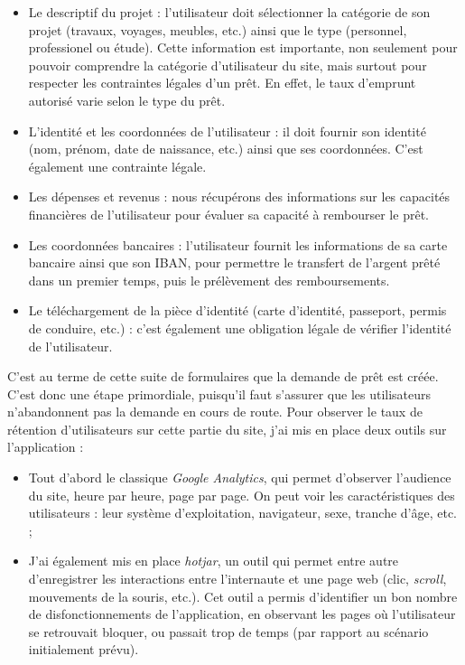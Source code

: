 \documentclass[12pt,a4paper]{article}
\providecommand{\tightlist}{%
  \setlength{\itemsep}{0pt}\setlength{\parskip}{0pt}}
\begin{document}
  \begin{itemize}
  \tightlist
  \item
    Le descriptif du projet : l'utilisateur doit sélectionner la catégorie
    de son projet (travaux, voyages, meubles, etc.) ainsi que le type
    (personnel, professionel ou étude). Cette information est importante,
    non seulement pour pouvoir comprendre la catégorie d'utilisateur du
    site, mais surtout pour respecter les contraintes légales d'un prêt.
    En effet, le taux d'emprunt autorisé varie selon le type du prêt.
  \item
    L'identité et les coordonnées de l'utilisateur : il doit fournir son
    identité (nom, prénom, date de naissance, etc.) ainsi que ses
    coordonnées. C'est également une contrainte légale.
  \item
    Les dépenses et revenus : nous récupérons des informations sur les
    capacités financières de l'utilisateur pour évaluer sa capacité à
    rembourser le prêt.
  \item
    Les coordonnées bancaires : l'utilisateur fournit les informations de
    sa carte bancaire ainsi que son IBAN, pour permettre le transfert de
    l'argent prêté dans un premier temps, puis le prélèvement des
    remboursements.
  \item
    Le téléchargement de la pièce d'identité (carte d'identité, passeport,
    permis de conduire, etc.) : c'est également une obligation légale de
    vérifier l'identité de l'utilisateur.
  \end{itemize}

  \bigskip

  C'est au terme de cette suite de formulaires que la demande de prêt est
  créée. C'est donc une étape primordiale, puisqu'il faut s'assurer que
  les utilisateurs n'abandonnent pas la demande en cours de route. Pour
  observer le taux de rétention d'utilisateurs sur cette partie du site,
  j'ai mis en place deux outils sur l'application :

  \begin{itemize}
  \tightlist
  \item
    Tout d'abord le classique \emph{Google Analytics}, qui permet
    d'observer l'audience du site, heure par heure, page par page. On peut
    voir les caractéristiques des utilisateurs : leur système
    d'exploitation, navigateur, sexe, tranche d'âge, etc. ;
  \item
    J'ai également mis en place \emph{hotjar}, un outil qui permet entre
    autre d'enregistrer les interactions entre l'internaute et une page
    web (clic, \emph{scroll}, mouvements de la souris, etc.). Cet outil a
    permis d'identifier un bon nombre de disfonctionnements de
    l'application, en observant les pages où l'utilisateur se retrouvait
    bloquer, ou passait trop de temps (par rapport au scénario
    initialement prévu).
  \end{itemize}
\end{document}
